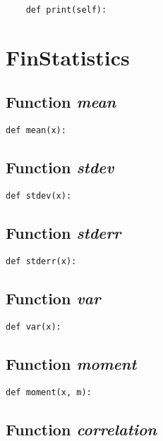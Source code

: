 \documentclass[twoside,11pt]{book}
\begin{document}
\begin{lstlisting}
    def print(self):
\end{lstlisting}

\newpage
\section{FinStatistics}

\subsection{Function {\it mean}}


\begin{lstlisting}
def mean(x):
\end{lstlisting}

\subsection{Function {\it stdev}}


\begin{lstlisting}
def stdev(x):
\end{lstlisting}

\subsection{Function {\it stderr}}


\begin{lstlisting}
def stderr(x):
\end{lstlisting}

\subsection{Function {\it var}}


\begin{lstlisting}
def var(x):
\end{lstlisting}

\subsection{Function {\it moment}}


\begin{lstlisting}
def moment(x, m):
\end{lstlisting}

\subsection{Function {\it correlation}}
\end{document}
